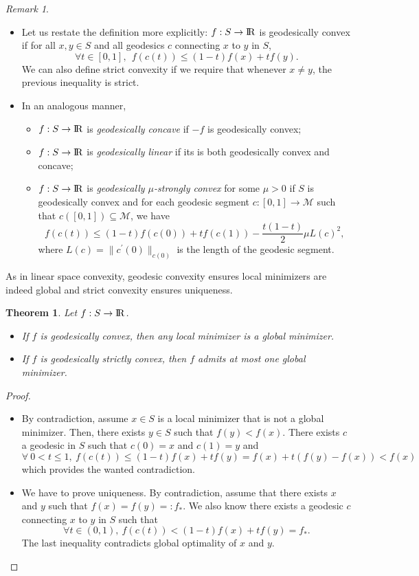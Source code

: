 \documentclass[10pt,a4paper]{book}
\theoremstyle{definition}
\theoremstyle{plain}
\newtheorem{thm}{Theorem}[section]
\theoremstyle{remark}
\newtheorem{rmk}{Remark}[section]
\newcommand \M {\mathcal{M}}
\def\R{{\rm I\kern-0.16em R}}
\begin{document}
\begin{rmk}~\begin{itemize}
\item Let us restate the definition more explicitly: $f:S\to \R$ is geodesically convex if for all $x,y \in S$ and all geodesics $c$ connecting $x$ to $y$ in $S$,
$$\forall t\in [0,1],~~f(c(t))\leq (1-t)f(x)+tf(y).$$
We can also define strict convexity if we require that whenever $x\neq y$, the previous inequality is strict.
\item In an analogous manner,
\begin{itemize}
\item[(i)] $f:S\to \R$ is \emph{geodesically concave} if $- f$ is geodesically convex;
\item[(ii)] $f:S\to \R$ is \emph{geodesically linear }if its is both geodesically convex and concave;
\item[(iii)] $f:S\to \R$ is \emph{geodesically $\mu$-strongly convex} for some $\mu>0$ if $S$ is geodesically convex and for each geodesic segment $c:[0,1] \to \M$ such that $c([0,1])\subseteq \M$, we have
$$f(c(t))\leq (1-t)f(c(0))+tf(c(1))-\frac{t(1-t)}{2}\mu L(c)^2,$$
where $L(c)=\|c^{\prime}(0)\|_{c(0)}$ is the length of the geodesic segment. 
\end{itemize}
\end{itemize}
\end{rmk}
As in linear space convexity, geodesic convexity ensures local minimizers are indeed global and strict convexity ensures uniqueness.
\begin{thm}\label{thm.globalmin} Let $f:S\to \R$.
\begin{itemize}
\item[(i)] If $f$ is geodesically convex, then any local minimizer is a global minimizer.
\item[(ii)] If $f$ is geodesically strictly convex, then $f$ admits at most one global minimizer.
\end{itemize}
\end{thm}
\begin{proof}~
\begin{itemize}
\item[(i)] By contradiction, assume $x\in S$ is a local minimizer that is not a global minimizer. Then, there exists $y\in S$ such that $f(y)<f(x)$. There exists $c$ a geodesic in $S$ such that $c(0)=x$ and $c(1)=y$ and
$$\forall ~0<t \leq 1,~f(c(t))\leq (1-t)f(x)+tf(y)=f(x)+t(f(y)-f(x))<f(x)$$
which provides the wanted contradiction.
\item[(ii)] We have to prove uniqueness. By contradiction, assume that there exists $x$ and $y$ such that $f(x)=f(y)=:f_{\ast}$. We also know there exists a geodesic $c$ connecting $x$ to $y$ in $S$ such that
$$\forall t \in (0,1),~f(c(t))<(1-t)f(x)+tf(y)=f_{\ast}.$$
The last inequality contradicts global optimality of $x$ and $y$.
\end{itemize}
\end{proof}
\end{document}
